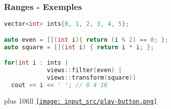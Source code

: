\documentclass[C++.tex]{subfiles}
\begin{document}
\begin{frame}[fragile]
	\frametitle{Ranges - Exemples}
	\begin{lstlisting}[language=C++]
vector<int> ints{0, 1, 2, 3, 4, 5};

auto even = [](int i){ return (i % 2) == 0; };
auto square = [](int i) { return i * i; };

for(int i : ints | 
            views::filter(even) | 
            views::transform(square))
  cout << i << ' '; // 0 4 16\end{lstlisting}

	\vskip 10mm plus 10fill
	\hfill
	\href{https://godbolt.org/#g:!((g:!((g:!((h:codeEditor,i:(filename:'1',fontScale:14,fontUsePx:'0',j:1,lang:c%2B%2B,selection:(endColumn:1,endLineNumber:28,positionColumn:1,positionLineNumber:28,selectionStartColumn:1,selectionStartLineNumber:28,startColumn:1,startLineNumber:28),source:'%23include+%3Cranges%3E%0A%23include+%3Calgorithm%3E%0A%23include+%3Cvector%3E%0A%23include+%3Ciostream%3E%0A%0Aint+main()%0A%7B%0A++%7B%0A++++for(int+i+:+std::views::iota(1,+10))%0A++++%7B%0A++++++std::cout+%3C%3C+i+%3C%3C+!'+!'%3B%0A++++%7D%0A++++std::cout+%3C%3C+%22%5Cn%22%3B%0A++%7D%0A%0A++%7B%0A++++std::vector%3Cint%3E+foo%7B0,+1,+2,+3,+4,+5%7D%3B%0A++++auto+even+%3D+%5B%5D(int+i)%7B+return+(i+%25+2)+%3D%3D+0%3B+%7D%3B%0A++++auto+square+%3D+%5B%5D(int+i)+%7B+return+i+*+i%3B+%7D%3B%0A%0A++++for(int+i+:+foo+%7C+std::views::filter(even)+%7C++std::views::transform(square))%0A++++%7B%0A++++++std::cout+%3C%3C+i+%3C%3C+!'+!'%3B%0A++++%7D%0A++++std::cout+%3C%3C+%22%5Cn%22%3B%0A++%7D%0A%7D%0A'),l:'5',n:'0',o:'C%2B%2B+source+%231',t:'0')),k:50,l:'4',n:'0',o:'',s:0,t:'0'),(g:!((h:executor,i:(argsPanelShown:'1',compilationPanelShown:'0',compiler:g112,compilerOutShown:'0',execArgs:'',execStdin:'',fontScale:14,fontUsePx:'0',j:1,lang:c%2B%2B,libs:!((name:boost,ver:'175')),options:'-std%3Dc%2B%2B20',source:1,stdinPanelShown:'1',tree:'1',wrap:'0'),l:'5',n:'0',o:'Executor+x86-64+gcc+11.2+(C%2B%2B,+Editor+%231)',t:'0')),header:(),k:50,l:'4',n:'0',o:'',s:0,t:'0')),l:'2',n:'0',o:'',t:'0')),version:4}{\texttt{[image: input\_src/play-button.png]}}
\end{frame}
\end{document}
